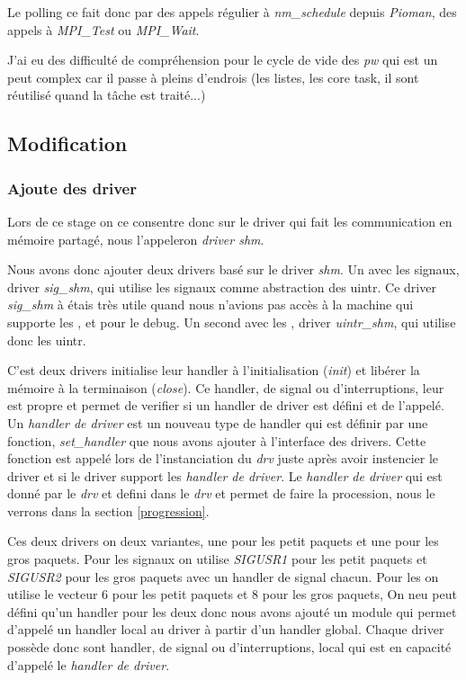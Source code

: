 Le polling ce fait donc par des appels régulier à \emph{nm_schedule} depuis \emph{Pioman}, des appels à \emph{MPI_Test} ou \emph{MPI_Wait}.

J'ai eu des difficulté de compréhension pour le cycle de vide des \emph{pw} qui est un peut complex car il passe à pleins d'endrois (les listes, les core task, il sont réutilisé quand la tâche est traité...)

\subsection{Modification}

\subsubsection{Ajoute des driver}

Lors de ce stage on ce consentre donc sur le driver qui fait les communication en mémoire partagé,
nous l'appeleron \emph{driver shm}.

Nous avons donc ajouter deux drivers basé sur le driver \emph{shm}.
Un avec les signaux, driver \emph{sig_shm},
qui utilise les signaux comme abstraction des uintr.
Ce driver \emph{sig_shm} à étais très utile quand nous n'avions pas accès à la machine qui supporte les \uintr{},
et pour le debug.
Un second avec les \uintr{}, driver \emph{uintr_shm}, qui utilise donc les uintr.

C'est deux drivers initialise leur handler à l'initialisation (\emph{init}) et libérer la mémoire à la terminaison (\emph{close}).
Ce handler, de signal ou d'interruptions, leur est propre et permet de verifier si un handler de driver est défini et de l'appelé.
Un \emph{handler de driver} est un nouveau type de handler qui est définir par une fonction, \emph{set_handler} que nous avons ajouter à l'interface des drivers.
Cette fonction est appelé lors de l'instanciation du \emph{drv} juste après avoir instencier le driver et si le driver support les \emph{handler de driver}.
Le \emph{handler de driver} qui est donné par le \emph{drv} et defini dans le \emph{drv} et permet de faire la procession,
nous le verrons dans la section \ref{progression}.

Ces deux drivers on deux variantes, une pour les petit paquets et une pour les gros paquets.
Pour les signaux on utilise \emph{SIGUSR1} pour les petit paquets et \emph{SIGUSR2} pour les gros paquets avec un handler de signal chacun.
Pour les \uintr{} on utilise le vecteur 6 pour les petit paquets et 8 pour les gros paquets,
On neu peut défini qu'un handler pour les deux donc nous avons ajouté un module qui permet d'appelé un handler local au driver à partir d'un handler global.
Chaque driver possède donc sont handler, de signal ou d'interruptions, local qui est en capacité d'appelé le \emph{handler de driver}.

